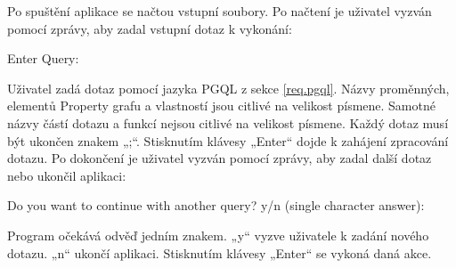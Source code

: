 Po spuštění aplikace se načtou vstupní soubory.
Po načtení je uživatel vyzván pomocí zprávy, aby zadal vstupní dotaz k vykonání:
\begin{code}
Enter Query:
\end{code}
Uživatel zadá dotaz pomocí jazyka PGQL z sekce \ref{req.pgql}.
Názvy proměnných, elementů Property grafu a vlastností jsou citlivé na velikost písmene.
Samotné názvy částí dotazu a funkcí nejsou citlivé na velikost písmene.
Každý dotaz musí být ukončen znakem „;“.
Stisknutím klávesy „Enter“ dojde k zahájení zpracování dotazu.
Po dokončení je uživatel vyzván pomocí zprávy, aby zadal další dotaz nebo ukončil aplikaci:
\begin{code}
Do you want to continue with another query?
    y/n (single character answer):
\end{code}
Program očekává odvěď jedním znakem.
„y“ vyzve uživatele k zadání nového dotazu.
„n“ ukončí aplikaci.
Stisknutím klávesy „Enter“ se vykoná daná akce.

